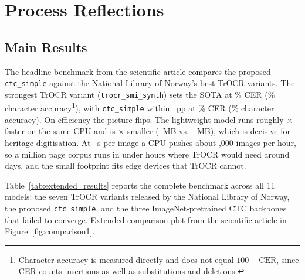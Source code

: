 \chapter{Process Reflections}
\label{chap:process-reflections}

\section{Main Results}
\label{sec:main-result}

The headline benchmark from the scientific article compares the proposed \texttt{ctc\_simple} against the National Library of Norway's best TrOCR variants. The strongest TrOCR variant (\texttt{trocr\_smi\_synth}) sets the SOTA at \trocrBestCER{}\% CER (\trocrBestCharAcc{}\% character accuracy\footnote{Character accuracy is measured directly and does not equal $100-\text{CER}$, since CER counts insertions as well as substitutions and deletions.}), with \texttt{ctc\_simple} within \cerGap{}~pp at \ctcCER{}\% CER (\ctcCharAcc{}\% character accuracy). On efficiency the picture flips. The lightweight model runs roughly \speedupFactor{}$\times$ faster on the same CPU and is \sizeRatio{}$\times$ smaller (\ctcSize{}~MB vs.\ \trocrSize{}~MB), which is decisive for heritage digitisation. At \ctcTime{}~s per image a CPU pushes about \ctcThroughputK{},000 images per hour, so a million page corpus runs in under \millionPagesCtcHours{} hours where TrOCR would need around \millionPagesTrocrDays{} days, and the small footprint fits edge devices that TrOCR cannot.

Table~\ref{tab:extended_results} reports the complete benchmark across all 11 models: the seven TrOCR variants released by the National Library of Norway, the proposed \texttt{ctc\_simple}, and the three ImageNet-pretrained CTC backbones that failed to converge. Extended comparison plot from the scientific article in Figure~\ref{fig:comparison1}.

